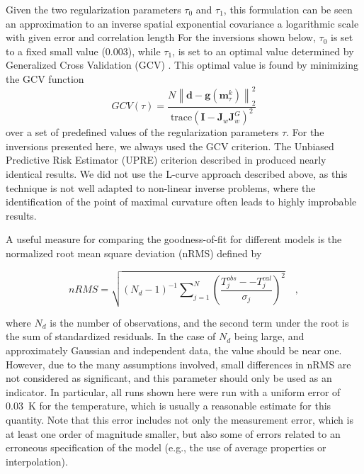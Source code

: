 \documentclass[cp]{copernicus}
\begin{document}
Given the two regularization parameters $\tau_0$ and $\tau_1$, this formulation can be seen an 
approximation to an inverse spatial exponential covariance a logarithmic scale with given error and 
correlation length \citep{Rodgers2000a, Tarantola2005a} For the inversions shown below, $\tau_0$ is 
set to a fixed small value (0.003), while $\tau_1$, is set to an optimal value determined by 
Generalized Cross Validation (GCV) \citep{Rath2007a,Farquharson2004a,Wahba1990a}. This optimal 
value is found by minimizing the GCV function 
\begin{equation}\label{eqn:10}
GCV(\tau ) = \frac
{N\left\| \mathbf{d} - \mathbf{g}(\mathbf{m}_\tau ^k) \right\|_2^2}
{\text{trace}
\left(\mathbf{I} - \mathbf{J}_w^{}\mathbf{J}_w^G \right)^2} 
\end{equation} 
\noindent over a set of predefined values of the regularization parameters $\tau$. For the 
inversions presented here, we always used the GCV criterion. The Unbiased Predictive Risk Estimator 
(UPRE) criterion described in \citet{Vogel2002a} produced nearly identical results. We did not use 
the L-curve approach described above, as this technique is not well adapted to non-linear inverse 
problems, where the identification of the point of maximal curvature often leads to highly 
improbable results. 

A useful measure for comparing the goodness-of-fit for different models is the normalized root mean 
square deviation (nRMS) defined by
 
\begin{equation}\label{eqn:11}
nRMS = \sqrt {\left( {{N_d} - 1} \right)_{}^{ - 1}\sum\nolimits_{j = 1}^N 
{{{\left( {\frac{{T_j^{obs}--T_j^{cal}}}{{{\sigma _j}}}} \right)}^2}} } \quad ,
\end{equation} 

where $N_d$ is the number of observations, and the second term under the root is the sum of 
standardized residuals. In the case of $N_d$ being large, and approximately Gaussian and independent 
data, the value should be near one. However, due to the many assumptions involved, small differences 
in nRMS are not considered as significant, and this parameter should only be used as an indicator. 
In particular, all runs shown here were run with a uniform error of 0.03~K for the temperature, 
which is usually a reasonable estimate for this quantity. Note that this error includes not only the 
measurement error, which is at least one order of magnitude smaller, but also some of errors related 
to an erroneous specification of the model (e.g., the use of average properties or interpolation). 
\end{document}
